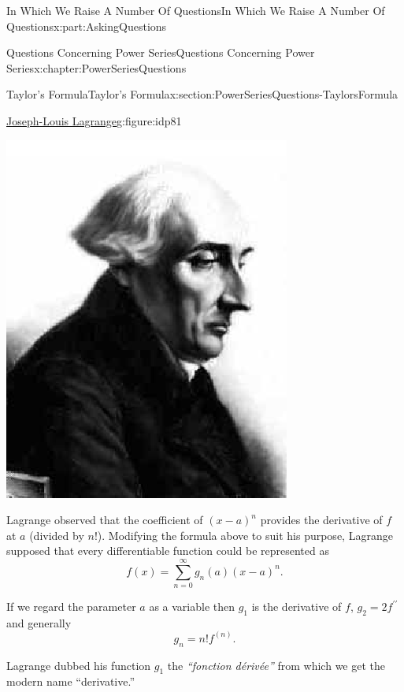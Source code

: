 \documentclass[oneside,10pt,]{book}
\numberwithin{equation}{section}
\begin{document}
\begin{partptx}{In Which We Raise A Number Of Questions}{}{In Which We Raise A Number Of Questions}{}{}{x:part:AskingQuestions}
\begin{chapterptx}{Questions Concerning Power Series}{}{Questions Concerning Power Series}{}{}{x:chapter:PowerSeriesQuestions}
\begin{sectionptx}{Taylor's Formula}{}{Taylor's Formula}{}{}{x:section:PowerSeriesQuestions-TaylorsFormula}
\begin{figureptx}{\href{https://mathshistory.st-andrews.ac.uk/Biographies/Lagrange/}{Joseph-Louis Lagrange}\protect\footnotemark{}}{g:figure:idp81}{}
\begin{image}{0.325}{0.35}{0.325}
\includegraphics[width=\linewidth]{images/Lagrange.png}
\end{image}%
\tcblower
\end{figureptx}%
%
Lagrange observed that the coefficient of \((x-a)^n\) provides the derivative of \(f\) at \(a\) (divided by \(n!\)). Modifying the formula above to suit his purpose, Lagrange supposed that every differentiable function could be represented as%
\begin{equation*}
f(x) = \sum_{n=0}^\infty g_n(a)(x-a)^n\text{.}
\end{equation*}
%
\par
If we regard the parameter \(a\) as a variable then \(g_1\) is the derivative of \(f\), \(g_2=2f^{\prime\prime}\) and generally%
\begin{equation*}
g_n=n!f^{(n)}\text{.}
\end{equation*}
%
\par
Lagrange dubbed his function \(g_1\) the \textit{``fonction dérivée''} from which we get the modern name ``derivative.''%

\end{sectionptx}
\end{chapterptx}
\end{partptx}
\end{document}
